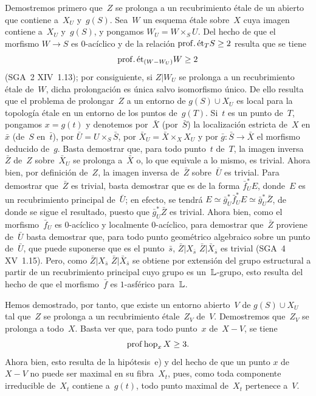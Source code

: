 Demostremos primero que~$Z$ se prolonga a un recubrimiento étale de un
abierto que contiene a~$X_U$ y~$g(S)$. Sea~$W$ un esquema étale sobre~$X$
cuya imagen contiene a~$X_U$ y~$g(S)$, y pongamos $W_U=W\times_S U$. Del
hecho de que el morfismo $W\to S$ es $0$-acíclico y de la relación
$\mathrm{prof}.\,\mathrm{\acute{e}t}_T S\geq 2$ resulta que se tiene
$$
\mathrm{prof}.\,\mathrm{\acute{e}t}_{(W-W_U)} W\geq 2
$$
(SGA~2 XIV~1.13); por consiguiente, si $Z|W_U$ se prolonga a un
recubrimiento étale de~$W$, dicha prolongación es única salvo isomorfismo
único. De ello resulta que el problema de prolongar~$Z$ a un entorno de
$g(S)\cup X_U$ es local para la topología étale en un entorno de los
puntos de~$g(T)$. Si~$t$ es un punto de~$T$, pongamos $x=g(t)$ y denotemos
por~$\bar{X}$ (\resp por~$\bar{S}$) la localización estricta de~$X$ en
$\bar{x}$ (\resp de~$S$ en~$\bar{t}$), por
$\bar{U}=U\times_S\bar{S}$, por $\bar{X}_U=\bar{X}\times_X X_U$ y por
$\bar{g}\colon\bar{S}\to\bar{X}$ el morfismo deducido de~$g$. Basta
demostrar que, para todo punto~$t$ de~$T$, la imagen inversa~$\bar{Z}$
de~$Z$ sobre~$\bar{X}_U$ se prolonga a~$\bar{X}$ o, lo que equivale a lo
mismo, es trivial. Ahora bien, por definición de~$Z$, la imagen inversa
de~$\bar{Z}$ sobre~$\bar{U}$ es trivial. Para demostrar que~$\bar{Z}$ es
trivial, basta demostrar que es de la forma $\bar{f}^*_U E$, donde~$E$ es
un recubrimiento principal de~$\bar{U}$; en efecto, se tendrá
$E\simeq\bar{g}^*_U\bar{f}^*_U E\simeq\bar{g}^*_U\bar{Z}$, de donde se
sigue el resultado, puesto que $\bar{g}^*_U\bar{Z}$ es trivial. Ahora
bien, como el morfismo~$\bar{f}_U$ es $0$-acíclico y localmente
$0$-acíclico, para demostrar que~$\bar{Z}$ proviene de~$\bar{U}$ basta
demostrar que, para todo punto geométrico algebraico sobre un
punto de~$\bar{U}$, que puede suponerse que es el punto~$\bar{s}$,
{$\bar{Z}|X_{\bar{s}}$}
{$\bar{Z}|\bar{X}_{\bar{s}}$}
es trivial (SGA~4 XV~1.15). Pero, como
{$\bar{Z}|X_{\bar{s}}$}
{$\bar{Z}|\bar{X}_{\bar{s}}$}
se obtiene por extensión del grupo estructural a
partir de un recubrimiento principal cuyo grupo es un~$\mathbb L$-grupo, esto
resulta del hecho de que el morfismo~$\bar{f}$ es $1$-asférico para~$\mathbb L$.

Hemos
demostrado, por tanto, que existe un entorno abierto~$V$ de
$g(S)\cup X_U$ tal que~$Z$ se prolonga a un recubrimiento étale~$Z_V$
de~$V$. Demostremos que~$Z_V$ se prolonga a todo~$X$. Basta ver que, para
todo punto~$x$ de~$X-V$, se tiene
$$
\operatorname{prof}\operatorname{hop}_x X\geq 3.
$$
Ahora bien, esto resulta de la hipótesis~e) y del hecho de que un punto
$x$ de~$X-V$ no puede ser maximal en su fibra~$X_t$, pues, como toda
componente irreducible de~$X_t$ contiene a~$g(t)$, todo punto maximal
de~$X_t$ pertenece a~$V$.
